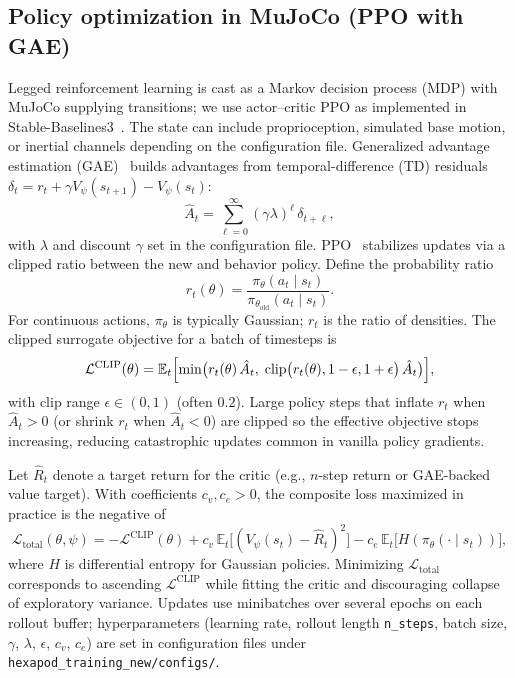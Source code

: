 \documentclass[11pt]{article}
\begin{document}
\subsection{Policy optimization in MuJoCo (PPO with GAE)}
\label{sec:math-ppo}
Legged reinforcement learning is cast as a Markov decision process (MDP) with MuJoCo supplying transitions; we use actor--critic PPO as implemented in Stable-Baselines3~\cite{raffin2021stable}. The state can include proprioception, simulated base motion, or inertial channels depending on the configuration file. Generalized advantage estimation (GAE)~\cite{schulman2017proximal} builds advantages from temporal-difference (TD) residuals $\delta_t = r_t + \gamma V_\psi(s_{t+1}) - V_\psi(s_t)$:
\begin{equation}
  \hat{A}_t = \sum_{\ell=0}^{\infty}(\gamma\lambda)^\ell\,\delta_{t+\ell},
  \label{eq:gae}
\end{equation}
with $\lambda$ and discount $\gamma$ set in the configuration file. PPO~\cite{schulman2017proximal} stabilizes updates via a clipped ratio between the new and behavior policy. Define the probability ratio
\begin{equation}
  r_t(\theta)=\frac{\pi_\theta(a_t\mid s_t)}{\pi_{\theta_{\mathrm{old}}}(a_t\mid s_t)}.
\end{equation}
For continuous actions, $\pi_\theta$ is typically Gaussian; $r_t$ is the ratio of densities. The clipped surrogate objective for a batch of timesteps is
\begin{equation}
  \mathcal{L}^{\mathrm{CLIP}}(\theta)
  = \mathbb{E}_t\Bigl[
 \min\bigl(
      r_t(\theta)\,\hat{A}_t,\;
      \mathrm{clip}\bigl(r_t(\theta),1-\epsilon,1+\epsilon\bigr)\,\hat{A}_t
    \bigr)
  \Bigr],
  \label{eq:ppo-clip}
\end{equation}
with clip range $\epsilon\in(0,1)$ (often $0.2$). Large policy steps that inflate $r_t$ when $\hat{A}_t>0$ (or shrink $r_t$ when $\hat{A}_t<0$) are clipped so the effective objective stops increasing, reducing catastrophic updates common in vanilla policy gradients.

Let $\hat{R}_t$ denote a target return for the critic (e.g., $n$-step return or GAE-backed value target). With coefficients $c_v,c_e>0$, the composite loss maximized in practice is the negative of
\begin{equation}
  \mathcal{L}_{\mathrm{total}}(\theta,\psi)
  = -\mathcal{L}^{\mathrm{CLIP}}(\theta)
  + c_v\,\mathbb{E}_t\bigl[(V_\psi(s_t)-\hat{R}_t)^2\bigr]
  - c_e\,\mathbb{E}_t\bigl[H(\pi_\theta(\cdot\mid s_t))\bigr],
  \label{eq:ppo-total-loss}
\end{equation}
where $H$ is differential entropy for Gaussian policies. Minimizing $\mathcal{L}_{\mathrm{total}}$ corresponds to ascending $\mathcal{L}^{\mathrm{CLIP}}$ while fitting the critic and discouraging collapse of exploratory variance. Updates use minibatches over several epochs on each rollout buffer; hyperparameters (learning rate, rollout length \texttt{n\_steps}, batch size, $\gamma$, $\lambda$, $\epsilon$, $c_v$, $c_e$) are set in configuration files under \texttt{hexapod\_training\_new/configs/}.
\end{document}
